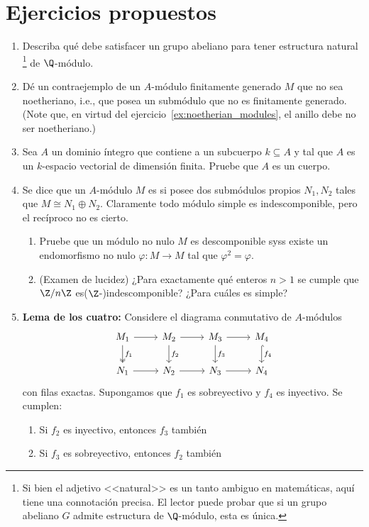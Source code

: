 \documentclass[11pt, reqno]{amsart}
\begin{document}
\appendix
\section{Ejercicios propuestos}
\begin{enumerate}
	\item Describa qué debe satisfacer un grupo abeliano para tener estructura natural%
		\footnote{Si bien el adjetivo <<natural>> es un tanto ambiguo en matemáticas, aquí tiene una connotación
		precisa. El lector puede probar que si un grupo abeliano $G$ admite estructura de $\Q$-módulo, esta es única.}
		de $\Q$-módulo.

	\item\lookup
		Dé un contraejemplo de un $A$-módulo finitamente generado $M$ que no sea noetheriano, i.e., que posea un
		submódulo que no es finitamente generado.
		(Note que, en virtud del ejercicio~\ref{ex:noetherian_modules}, el anillo debe no ser noetheriano.)

	\item Sea $A$ un dominio íntegro que contiene a un subcuerpo $k \subseteq A$ y tal que $A$ es un $k$-espacio
		vectorial de dimensión finita.
		Pruebe que $A$ es un cuerpo.

	\item Se dice que un $A$-módulo $M$ es  si posee dos submódulos propios $N_1, N_2$
		tales que $M \cong N_1 \oplus N_2$.
		Claramente todo módulo simple es indescomponible, pero el recíproco no es cierto.
		\begin{enumerate}
			\item Pruebe que un módulo no nulo $M$ es descomponible syss existe un endomorfismo no nulo
				$\varphi \colon M \to M$ tal que $\varphi^2 = \varphi$.
			\item\lookright (Examen de lucidez)
				¿Para exactamente qué enteros $n > 1$ se cumple que $\Z/n\Z$ es\break ($\Z$-)indescomponible?
				¿Para cuáles es simple?
		\end{enumerate}

	\item \textbf{Lema de los cuatro:}
		Considere el diagrama conmutativo de $A$-módulos
		\[\begin{tikzcd}
			M_1 \dar["f_1", two heads] \rar & M_2 \dar["f_2"] \rar & M_3 \dar["f_3"] \rar & M_4
			\dar["f_4", hook] \\
			N_1 \rar & N_2 \rar & N_3 \rar & N_4
		\end{tikzcd}\]
		con filas exactas.
		Supongamos que $f_1$ es sobreyectivo y $f_4$ es inyectivo.
		Se cumplen:
		\begin{enumerate}
			\item Si $f_2$ es    inyectivo, entonces $f_3$ también
			\item Si $f_3$ es sobreyectivo, entonces $f_2$ también
		\end{enumerate}
\end{enumerate}
\end{document}
